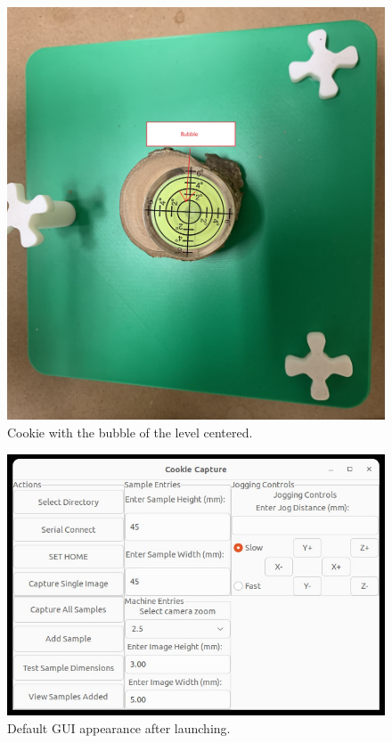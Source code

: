 \documentclass{article}
\begin{document}
\begin{outline}[enumerate]
    \begin{figure}
        \includegraphics[width=\linewidth]{../content/sample_levelled.jpg}
        \caption{Cookie with the bubble of the level centered.}
        \label{fig:level2}
    \end{figure}
    
    \begin{figure}
        \includegraphics[width=\linewidth]{../content/gui.jpg}
        \caption{Default GUI appearance after launching.}
        \label{fig:gui1}
    \end{figure}
    

\end{outline}
\end{document}
